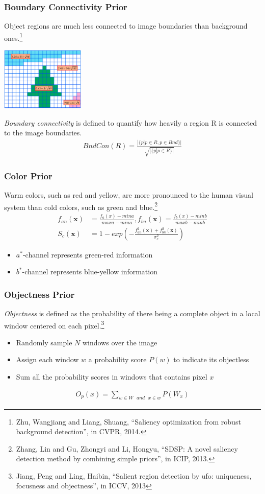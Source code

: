 \documentclass[notheorems,serif,table,compress]{beamer}  %
\begin{document}
\begin{frame}
\frametitle{Boundary Connectivity Prior}
{\color{blue}Object regions are much less connected to image boundaries than background ones.}\footnote{Zhu, Wangjiang and Liang, Shuang, ``Saliency optimization from robust background detection'', in CVPR, 2014.}

\centering\includegraphics[width=4cm]{wCtr.png}

\emph{Boundary connectivity} is defined to quantify how heavily a region R is connected to the image boundaries.
\begin{align}
BndCon(R) = \frac{|\{p|p\in R, p\in Bnd\}|}{\sqrt{|\{p|p\in R\}|}}
\end{align}
\end{frame}


\begin{frame}
\frametitle{Color Prior}
{\color{blue}Warm colors, such as red and yellow, are more pronounced to the human visual system than cold colors, such as green and blue.}\footnote{Zhang, Lin and Gu, Zhongyi and Li, Hongyu, ``SDSP: A novel saliency detection method by combining simple priors'', in ICIP, 2013.}
\begin{align}
f_{an}(\textbf{x}) & =\frac{f_a(x)-mina}{maxa-mina}, f_{bn}(\textbf{x}) = \frac{f_b(x)-minb}{maxb-minb}\\
S_c(\textbf{x}) & = 1-exp\left(-\frac{f_{an}^2(\textbf{x})+f_{bn}^2(\textbf{x})}{\sigma_c^2}\right)
\end{align}
\begin{itemize}
\item $a^*$-channel represents green-red information
\item $b^*$-channel represents blue-yellow information
\end{itemize}
\end{frame}


\begin{frame}
\frametitle{Objectness Prior}
{\color{blue}\emph{Objectness}} is defined as the probability of there being a complete object in a local window centered on each pixel.\footnote{Jiang, Peng and Ling, Haibin, ``Salient region detection by ufo: uniqueness, focusness and objectness'', in ICCV, 2013} 
\begin{itemize}
\item Randomly sample $N$ windows over the image 
\item Assign each window $w$ a probability score $P(w)$ to indicate its objectless
\item Sum all the probability scores in windows that contains pixel $x$
\end{itemize}
\begin{align}
O_p(x) = \sum_{w \in W \text{ }and \text{ } x \in w} P(W_x)
\end{align}
\end{frame}
\end{document}
